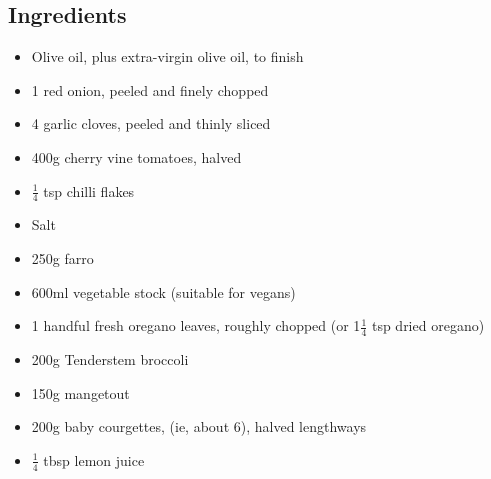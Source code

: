 \documentclass{book}
\begin{document}
\subsection*{Ingredients}
\begin{itemize}
\item Olive oil, plus extra-virgin olive oil, to finish
\item 1 red onion, peeled and finely chopped
\item 4 garlic cloves, peeled and thinly sliced
\item 400g cherry vine tomatoes, halved
\item $\frac{1}{4}$ tsp chilli flakes
\item Salt
\item 250g farro
\item 600ml vegetable stock (suitable for vegans)
\item 1 handful fresh oregano leaves, roughly chopped (or 1$\frac{1}{4}$ tsp dried oregano)
\item 200g Tenderstem broccoli
\item 150g mangetout
\item 200g baby courgettes, (ie, about 6), halved lengthways
\item $\frac{1}{4}$ tbsp lemon juice
\end{itemize}
\end{document}
